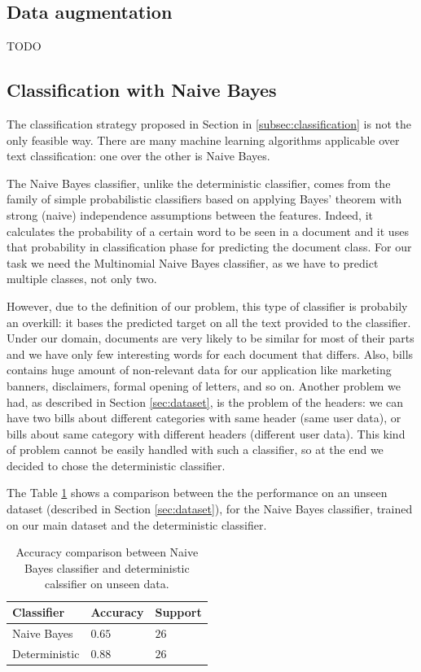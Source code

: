\documentclass[10pt,twocolumn,letterpaper]{article}
\begin{document}
\subsection{Data augmentation}

TODO

\subsection{Classification with Naive Bayes}
\label{subsec:classification-naive-bayes}

The classification strategy proposed in Section in
\ref{subsec:classification} is not the only feasible way. There are
many machine learning algorithms applicable over text classification:
one over the other is Naive Bayes.

The Naive Bayes classifier, unlike the deterministic classifier, comes
from the family of simple probabilistic classifiers based on applying
Bayes' theorem with strong (naive) independence assumptions between
the features. Indeed, it calculates the probability of a certain word
to be seen in a document and it uses that probability in
classification phase for predicting the document class. For our task
we need the Multinomial Naive Bayes classifier, as we have to predict
multiple classes, not only two.

However, due to the definition of our problem, this type of classifier
is probabily an overkill: it bases the predicted target on all the
text provided to the classifier. Under our domain, documents are very
likely to be similar for most of their parts and we have only few
interesting words for each document that differs. Also, bills contains
huge amount of non-relevant data for our application like marketing
banners, disclaimers, formal opening of letters, and so on. Another
problem we had, as described in Section \ref{sec:dataset}, is the
problem of the headers: we can have two bills about different
categories with same header (same user data), or bills about same
category with different headers (different user data). This kind of
problem cannot be easily handled with such a classifier, so at the end
we decided to chose the deterministic classifier.

The Table \ref{table:classifiers-comparison} shows a comparison
between the the performance on an unseen dataset (described in Section
\ref{sec:dataset}), for the Naive Bayes classifier, trained on our
main dataset and the deterministic classifier.

\begin{table}[!h]
  \begin{center}
    \begin{tabular}{lll}
      \hline
      Classifier & Accuracy & Support \\ \hline
      Naive Bayes & $0.65$ & $26$ \\
      Deterministic & $0.88$ & $26$ \\ \hline
    \end{tabular}
  \end{center}
  \label{table:classifiers-comparison}
  \caption{Accuracy comparison between Naive Bayes classifier and
    deterministic calssifier on unseen data.}
\end{table}
\end{document}
